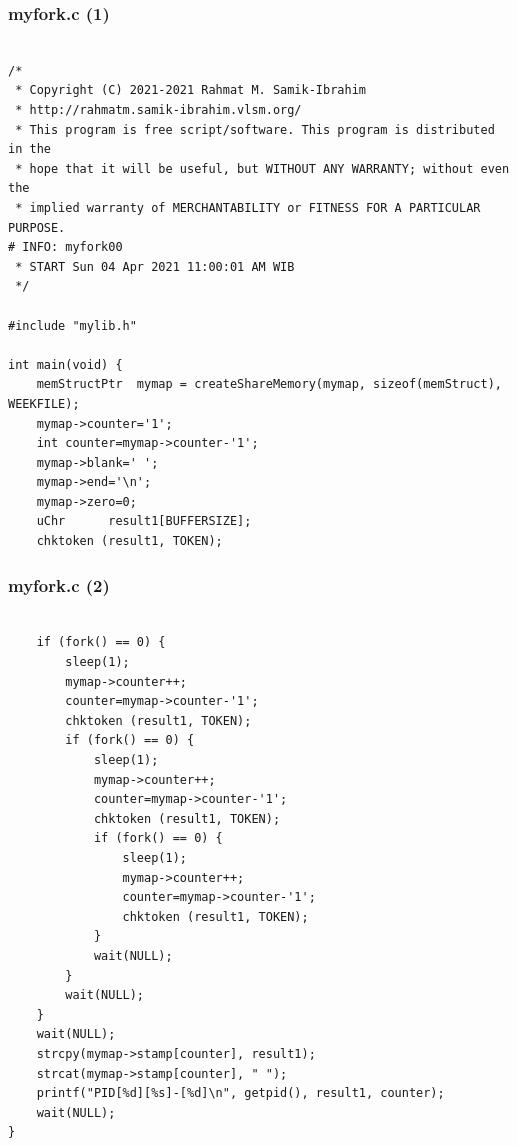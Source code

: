 \documentclass[aspectratio=169, xcolor=table, notheorems, hyperref={pdfpagelabels=false}]{beamer}
\begin{document}
\begin{frame}[fragile]
\frametitle{myfork.c (1)}
\begin{lstlisting}[basicstyle=\ttfamily\tiny]         % 108

/*
 * Copyright (C) 2021-2021 Rahmat M. Samik-Ibrahim
 * http://rahmatm.samik-ibrahim.vlsm.org/
 * This program is free script/software. This program is distributed in the 
 * hope that it will be useful, but WITHOUT ANY WARRANTY; without even the 
 * implied warranty of MERCHANTABILITY or FITNESS FOR A PARTICULAR PURPOSE.
# INFO: myfork00
 * START Sun 04 Apr 2021 11:00:01 AM WIB
 */

#include "mylib.h"

int main(void) {
    memStructPtr  mymap = createShareMemory(mymap, sizeof(memStruct), WEEKFILE);
    mymap->counter='1';
    int counter=mymap->counter-'1';
    mymap->blank=' ';
    mymap->end='\n';
    mymap->zero=0;
    uChr      result1[BUFFERSIZE];
    chktoken (result1, TOKEN);

\end{lstlisting}
\end{frame}

\begin{frame}[fragile]
\frametitle{myfork.c (2)}
\begin{lstlisting}[basicstyle=\ttfamily\tiny]         % 108

    if (fork() == 0) {
        sleep(1);
        mymap->counter++;
        counter=mymap->counter-'1';
        chktoken (result1, TOKEN);
        if (fork() == 0) {
            sleep(1);
            mymap->counter++;
            counter=mymap->counter-'1';
            chktoken (result1, TOKEN);
            if (fork() == 0) {
                sleep(1);
                mymap->counter++;
                counter=mymap->counter-'1';
                chktoken (result1, TOKEN);
            }
            wait(NULL);
        }
        wait(NULL);
    }
    wait(NULL);
    strcpy(mymap->stamp[counter], result1);
    strcat(mymap->stamp[counter], " ");
    printf("PID[%d][%s]-[%d]\n", getpid(), result1, counter);
    wait(NULL);
}

\end{lstlisting}
\end{frame}
\end{document}
